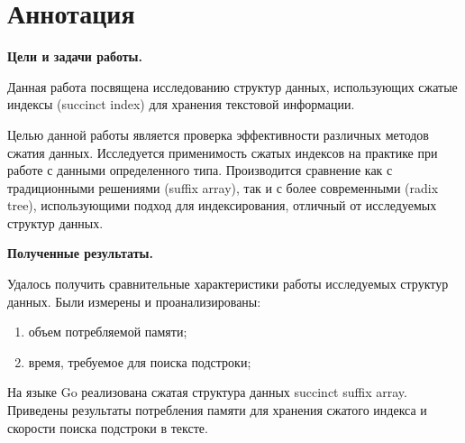 \newpage
\section*{Аннотация}

\textbf{Цели и задачи работы.}

Данная работа посвящена исследованию структур данных,
использующих сжатые индексы (succinct index) для хранения текстовой информации.

Целью данной работы является проверка эффективности различных методов сжатия данных.
Исследуется применимость сжатых индексов на практике при работе с данными определенного типа.
Производится сравнение как с традиционными решениями (suffix array), так и с более современными (radix tree),
использующими подход для индексирования, отличный от исследуемых структур данных.


\textbf{Полученные результаты.}


Удалось получить сравнительные характеристики работы исследуемых структур данных.
Были измерены и проанализированы:
\begin{enumerate}
    \item объем потребляемой памяти;
    \item время, требуемое для поиска подстроки;
\end{enumerate}

На языке Go реализована сжатая структура данных succinct suffix array. Приведены результаты потребления памяти
для хранения сжатого индекса и скорости поиска подстроки в тексте.


